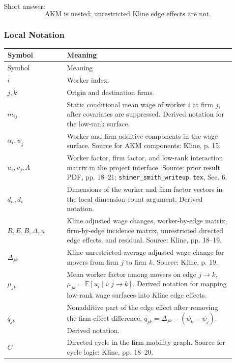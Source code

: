 ﻿\documentclass[11pt]{article}
\newcommand{\E}{\mathbb{E}}
\newcommand{\1}{\mathbf{1}}
\begin{document}
Short answer:
\[
\text{AKM is nested; unrestricted Kline edge effects are not.}
\]

\subsubsection{Local Notation}

\begin{longtable}{>{\raggedright\arraybackslash}p{0.24\linewidth}
                >{\raggedright\arraybackslash}p{0.68\linewidth}}
\toprule
Symbol & Meaning \\
\midrule
\endfirsthead
\toprule
Symbol & Meaning \\
\midrule
\endhead
$i$ & Worker index. \\
$j,k$ & Origin and destination firms. \\
$m_{ij}$ & Static conditional mean wage of worker $i$ at firm $j$, after covariates are suppressed. Derived notation for the low-rank surface. \\
$\alpha_i,\psi_j$ & Worker and firm additive components in the wage surface. Source for AKM components: Kline, p. 15. \\
$u_i,v_j,\Lambda$ & Worker factor, firm factor, and low-rank interaction matrix in the project interface. Source: prior result PDF, pp. 18--21; \texttt{shimer\_smith\_writeup.tex}, Sec. 6. \\
$d_u,d_v$ & Dimensions of the worker and firm factor vectors in the local dimension-count argument. Derived notation. \\
$R,E,B,\Delta,u$ & Kline adjusted wage changes, worker-by-edge matrix, firm-by-edge incidence matrix, unrestricted directed edge effects, and residual. Source: Kline, pp. 18--19. \\
$\Delta_{jk}$ & Kline unrestricted average adjusted wage change for movers from firm $j$ to firm $k$. Source: Kline, p. 19. \\
$\mu_{jk}$ & Mean worker factor among movers on edge $j\to k$, $\mu_{jk}=\E[u_i\mid i:j\to k]$. Derived notation for mapping low-rank wage surfaces into Kline edge effects. \\
$q_{jk}$ & Nonadditive part of the edge effect after removing the firm-effect difference, $q_{jk}=\Delta_{jk}-(\psi_k-\psi_j)$. Derived notation. \\
$C$ & Directed cycle in the firm mobility graph. Source for cycle logic: Kline, pp. 18--20. \\
\bottomrule
\end{longtable}
\end{document}
